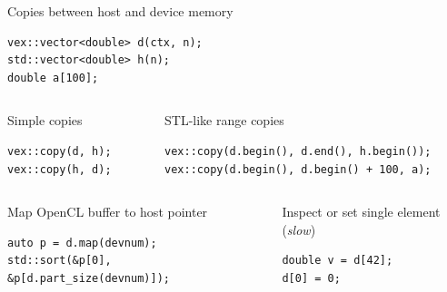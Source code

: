 \documentclass[@BEAMER_OPTIONS@]{beamer}
\begin{document}
\begin{frame}[fragile]{Copies between host and device memory}
    \begin{exampleblock}{}
        \begin{lstlisting}
vex::vector<double> d(ctx, n);
std::vector<double> h(n);
double a[100];
        \end{lstlisting}
    \end{exampleblock}
    \vspace{\baselineskip}
    \begin{columns}
        \begin{column}{0.45\textwidth}
            \begin{exampleblock}{Simple copies}
                \begin{lstlisting}
vex::copy(d, h);
vex::copy(h, d);
                \end{lstlisting}
            \end{exampleblock}
        \end{column}
        \pause
        \begin{column}{0.5\textwidth}
            \begin{exampleblock}{STL-like range copies}
                \begin{lstlisting}
vex::copy(d.begin(), d.end(), h.begin());
vex::copy(d.begin(), d.begin() + 100, a);
                \end{lstlisting}
            \end{exampleblock}
        \end{column}
    \end{columns}
    \vspace{\baselineskip}
    \pause
    \begin{columns}
        \begin{column}{0.45\textwidth}
            \begin{exampleblock}{Map OpenCL buffer to host pointer}
                \begin{lstlisting}
auto p = d.map(devnum);
std::sort(&p[0], &p[d.part_size(devnum)]);
                \end{lstlisting}
            \end{exampleblock}
        \end{column}
        \pause
        \begin{column}{0.5\textwidth}
            \begin{exampleblock}{Inspect or set single element (\emph{slow})}
                \begin{lstlisting}
double v = d[42];
d[0] = 0;
                \end{lstlisting}
            \end{exampleblock}
        \end{column}
    \end{columns}
\end{frame}
\end{document}
